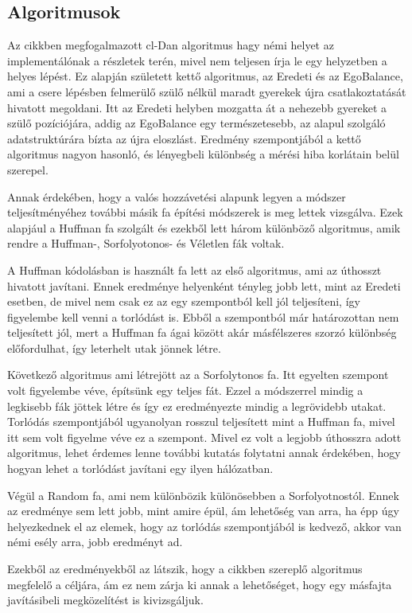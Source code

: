 \documentclass[12pt]{report}
\begin{document}
\subsection{Algoritmusok}

Az cikkben megfogalmazott cl-Dan algoritmus hagy némi helyet az implementálónak a részletek terén, mivel nem teljesen írja le egy helyzetben a helyes lépést.
Ez alapján született kettő algoritmus, az Eredeti és az EgoBalance, ami a csere lépésben felmerülő szülő nélkül maradt gyerekek újra csatlakoztatását hivatott megoldani.
Itt az Eredeti helyben mozgatta át a nehezebb gyereket a szülő pozíciójára, addig az EgoBalance egy természetesebb, az alapul szolgáló adatstruktúrára bízta az újra eloszlást.
Eredmény szempontjából a kettő algoritmus nagyon hasonló, és lényegbeli különbség a mérési hiba korlátain belül szerepel.

Annak érdekében, hogy a valós hozzávetési alapunk legyen a módszer teljesítményéhez további másik fa építési módszerek is meg lettek vizsgálva.
Ezek alapjául a Huffman fa szolgált és ezekből lett három különböző algoritmus, amik rendre a Huffman-, Sorfolyotonos- és Véletlen fák voltak.

A Huffman kódolásban is használt fa lett az első algoritmus, ami az úthosszt hivatott javítani.
Ennek eredménye helyenként tényleg jobb lett, mint az Eredeti esetben, de mivel nem csak ez az egy szempontból kell jól teljesíteni, így figyelembe kell venni a torlódást is.
Ebből a szempontból már határozottan nem teljesített jól, mert a Huffman fa ágai között akár másfélszeres szorzó különbség előfordulhat, így leterhelt utak jönnek létre. 

Következő algoritmus ami létrejött az a Sorfolytonos fa.
Itt egyelten szempont volt figyelembe véve, építsünk egy teljes fát.
Ezzel a módszerrel mindig a legkisebb fák jöttek létre és így ez eredményezte mindig a legrövidebb utakat.
Torlódás szempontjából ugyanolyan rosszul teljesített mint a Huffman fa, mivel itt sem volt figyelme véve ez a szempont.
Mivel ez volt a legjobb úthosszra adott algoritmus, lehet érdemes lenne további kutatás folytatni annak érdekében, hogy hogyan lehet a torlódást javítani egy ilyen hálózatban.

Végül a Random fa, ami nem különbözik különösebben a Sorfolyotnostól.
Ennek az eredménye sem lett jobb, mint amire épül, ám lehetőség van arra, ha épp úgy helyezkednek el az elemek, hogy az torlódás szempontjából is kedvező, akkor van némi esély arra, jobb eredményt ad.

Ezekből az eredményekből az látszik, hogy a cikkben szereplő algoritmus megfelelő a céljára, ám ez nem zárja ki annak a lehetőséget, hogy egy másfajta javításibeli megközelítést is kivizsgáljuk. 
\end{document}
